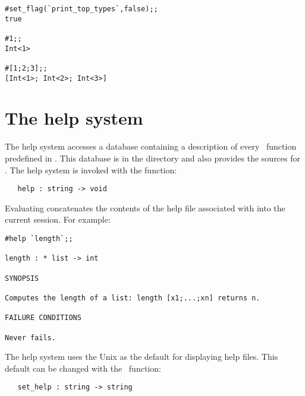 \begin{session}\begin{verbatim}
#set_flag(`print_top_types`,false);;
true 

#1;;
Int<1> 

#[1;2;3];;
[Int<1>; Int<2>; Int<3>] 
\end{verbatim}\end{session}


\section{The help system}

The help system accesses a database containing a description of every \ML\
function predefined in \HOL. This database is in the directory  and
also provides the sources for \REFERENCE.  The help system is invoked with the
function:

\begin{boxed}
\begin{verbatim}
   help : string -> void
\end{verbatim}\end{boxed}
Evaluating \ml{help `$foo$`} concatenates the
contents of the help file associated with \ml{$foo$} into the
current session. For example:
\vfill
\newpage
\setcounter{sessioncount}{1}
\begin{session}\begin{verbatim}
#help `length`;;

length : * list -> int

SYNOPSIS

Computes the length of a list: length [x1;...;xn] returns n.

FAILURE CONDITIONS

Never fails.
\end{verbatim}\end{session}


The help system uses the Unix \ml{cat} as the default for displaying help
files. This default can be changed with the \ML\ function:

\begin{boxed}
\begin{verbatim}
   set_help : string -> string
\end{verbatim}\end{boxed}

